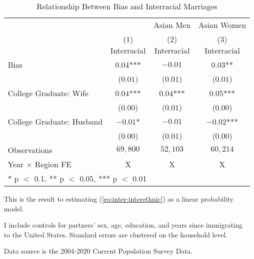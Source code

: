 \begin{table}[H]
\centering\centering
\caption{Relationship Between Bias and Interracial Marriages \label{regtab-logit-02}}
\centering
\begin{threeparttable}
\begin{tabular}[t]{lccc}
\toprule
\multicolumn{2}{c}{ } & \multicolumn{1}{c}{Asian Men} & \multicolumn{1}{c}{Asian Women} \\
\cmidrule(l{3pt}r{3pt}){3-3} \cmidrule(l{3pt}r{3pt}){4-4}
  & \specialcell{(1) \\ Interracial} & \specialcell{(2) \\ Interracial} & \specialcell{(3) \\ Interracial}\\
\midrule
Bias & $0.04$*** & $-0.01$ & $0.03$**\\
 & ($0.01$) & ($0.01$) & ($0.01$)\\
College Graduate: Wife & $0.04$*** & $0.04$*** & $0.05$***\\
 & ($0.00$) & ($0.01$) & \vphantom{1} ($0.00$)\\
College Graduate: Husband & $-0.01$* & $-0.01$ & $-0.02$***\\
 & ($0.00$) & ($0.01$) & ($0.00$)\\
\midrule
Observations & $69,800$ & $52,103$ & $60,214$\\
Year $\times$ Region FE & X & X & X\\
\bottomrule
\multicolumn{4}{l}{\rule{0pt}{1em}* p $<$ 0.1, ** p $<$ 0.05, *** p $<$ 0.01}\\
\end{tabular}
\begin{tablenotes}
\small
\item[1] \footnotesize{This is the result to estimating (\ref{eq:inter-interethnic}) as a
                      linear probability model.}
\item[2] \footnotesize{I include controls for partners' sex, age, education, 
                      and years since immigrating to the United States.
                      Standard errors are clustered on the household level.}
\item[3] \footnotesize{Data source is the 2004-2020 Current Population Survey Data.}
\end{tablenotes}
\end{threeparttable}
\end{table}
